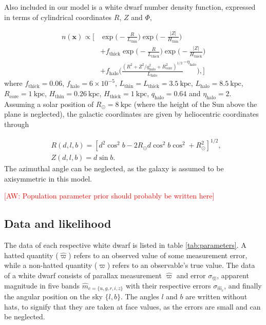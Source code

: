 \documentclass[fleqn,usenatbib]{mnras}
\newcommand{\aw}[1]{\textcolor{red}{[AW: #1]}}
\newcommand{\kpc}{\text{kpc}}
\begin{document}
Also included in our model is a white dwarf number density function, expressed in terms of cylindrical coordinates $R$, $Z$ and $\Phi$,

\begin{equation}\label{eq:numberdensity}
\begin{split}
	n(\mathbf{x}) \propto
	\Bigg[ 
		& \exp\Bigg(-\frac{R}{L_\text{thin}}\Bigg)\exp\Bigg(-\frac{|Z|}{H_\text{thin}}\Bigg) \\
		& +f_\text{thick}\exp\Bigg(-\frac{R}{L_\text{thick}}\Bigg)\exp\Bigg(-\frac{|Z|}{H_\text{thick}}\Bigg) \\
		& +f_\text{halo}\Bigg( \frac{(R^2+Z^2/q_\text{halo}^2+R_\text{core}^2)^{1/2}}{L_\text{halo}}^{-\eta_\text{halo}} \Bigg),
	\Bigg]
\end{split}
\end{equation}
where $f_\text{thick}=0.06$, $f_\text{halo}=6\times10^{-5}$, $L_\text{thin}=L_\text{thick}=3.5~\kpc$, $L_\text{halo}=8.5~\kpc$, $R_\text{core}=1~\kpc$, $H_\text{thin}=0.26~\kpc$, $H_\text{thick}=1~\kpc$, $q_\text{halo}=0.64$ and $\eta_\text{halo} = 2$. Assuming a solar position of $R_\odot=8~\kpc$ (where the height of the Sun above the plane is neglected), the galactic coordinates are given by heliocentric coordinates through

\begin{equation}
\begin{split}
	& R(d,l,b) = [d^2\cos^2b-2 R_\odot d \cos^2b\cos^2+R_\odot^2]^{1/2}, \\
	& Z(d,l,b) = d \sin b.
\end{split}
\end{equation}
The azimuthal angle can be neglected, as the galaxy is assumed to be axisymmetric in this model.

\aw{Population parameter prior should probably be written here}







\subsection{Data and likelihood}\label{sec:data}

The data of each respective white dwarf is listed in table \ref{tab:parameters}. A hatted quantity ($\hat{\varpi}$) refers to an observed value of some measurement error, while a non-hatted quantity ($\varpi$) refers to an observable's true value. The data of a white dwarf consists of parallax measurement $\hat{\varpi}$ and error $\sigma_{\hat{\varpi}}$, apparent magnitude in five bands $\hat{m}_{c=\{u,g,r,i,z\}}$ with their respective errors $\sigma_{\hat{m}_c}$, and finally the angular position on the sky $\{l,b\}$. The angles $l$ and $b$ are written without hats, to signify that they are taken at face values, as the errors are small and can be neglected.
\end{document}
